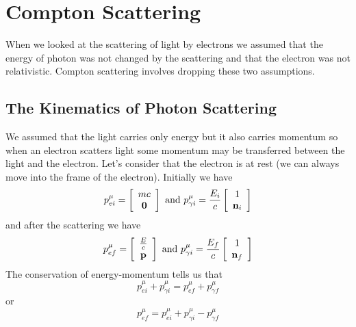 \chapter{Compton Scattering}
\label{cha:compton-scattering}
When we looked at the scattering of light by electrons we assumed that
the energy of photon was not changed by the scattering and that the
electron was not relativistic.  Compton scattering involves dropping
these two assumptions.

\section{The Kinematics of Photon Scattering}
\label{sec:kinem-phot-scatt}

We assumed that the light carries only energy but it also carries
momentum so when an electron scatters light some momentum may be
transferred between the light and the electron.  Let's consider that
the electron is at rest (we can always move into the frame of the
electron).  Initially we have
\begin{equation}
p^\mu_{ei} = \left [ \begin{array}{c}mc\\ {\bf 0}  \end{array} \right
] ~\hbox{\rm and}~ p^\mu_{\gamma i} = \frac{E_i}{c} \left [
  \begin{array}{c}1 \\ {\bf n}_i  \end{array} \right
]
\label{eq:397}
\end{equation}
and after the scattering we have
\begin{equation}
p^\mu_{ef} = \left [ \begin{array}{c}\frac{E}{c}\\ {\bf p}  \end{array} \right
] ~\hbox{\rm and}~ p^\mu_{\gamma i} = \frac{E_f}{c} \left [
  \begin{array}{c}1 \\ {\bf n}_f  \end{array} \right
]
\label{eq:398}
\end{equation}
The conservation of energy-momentum tells us that
\begin{equation}
p^\mu_{ei} + p^\mu_{\gamma i}  = p^\mu_{ef} + p^\mu_{\gamma f} 
\label{eq:399}
\end{equation}
or
\begin{equation}
p^\mu_{ef}  = p^\mu_{ei} + p^\mu_{\gamma i} -  p^\mu_{\gamma f} 
\label{eq:400}
\end{equation}
